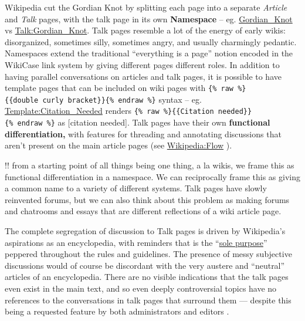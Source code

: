 \documentclass[notoc]{tufte-book}
\begin{document}
Wikipedia cut the Gordian Knot by splitting each page into a separate
\emph{Article} and \emph{Talk} pages, with the talk page in its own
\textbf{Namespace} -- eg.
\href{https://en.wikipedia.org/wiki/Gordian_Knot}{Gordian\_Knot} vs
\href{https://en.wikipedia.org/wiki/Talk:Gordian_Knot}{Talk:Gordian\_Knot}.
Talk pages resemble a lot of the energy of early wikis: disorganized,
sometimes silly, sometimes angry, and usually charmingly pedantic.
Namespaces extend the traditional ``everything is a page'' notion
encoded in the WikiCase link system by giving different pages different
roles. In addition to having parallel conversations on articles and talk
pages, it is possible to have template pages that can be included on
wiki pages with
\texttt{\{\%\ raw\ \%\}\{\{double\ curly\ bracket\}\}\{\%\ endraw\ \%\}}
syntax -- eg.
\href{https://en.wikipedia.org/wiki/Template:Citation_needed}{Template:Citation\_Needed}
renders
\texttt{\{\%\ raw\ \%\}\{\{Citation\ needed\}\}\{\%\ endraw\ \%\}} as
{[}citation needed{]}. Talk pages have their own \textbf{functional
differentiation,} with features for threading and annotating discussions
that aren't present on the main article pages (see
\href{https://en.wikipedia.org/wiki/Wikipedia:Flow}{Wikipedia:Flow} \citep{WikipediaFlow2021} ).

!! from a starting point of all things being one thing, a la wikis, we
frame this as functional differentiation in a namespace. We can
reciprocally frame this as giving a common name to a variety of
different systems. Talk pages have slowly reinvented forums, but we can
also think about this problem as making forums and chatrooms and essays
that are different reflections of a wiki article page.

The complete segregation of discussion to Talk pages is driven by
Wikipedia's aspirations as an encyclopedia, with reminders that is the
``\href{https://en.wikipedia.org/wiki/Wikipedia:Don't_lose_the_thread\#Move_to_the_article_talk_page}{sole
purpose}'' peppered throughout the rules and guidelines. The presence of
messy subjective discussions would of course be discordant with the very
austere and ``neutral'' articles of an encyclopedia. There are no
visible indications that the talk pages even exist in the main text, and
so even deeply controversial topics have no references to the
conversations in talk pages that surround them --- despite this being a
requested feature by both administrators and editors \citep{schneiderUnderstandingImprovingWikipedia2011} .
\end{document}
